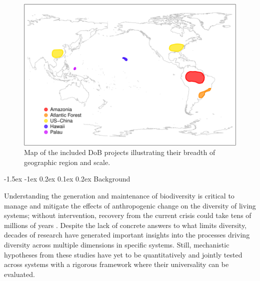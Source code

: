 \documentclass[11pt]{article}
\makeatletter
\renewcommand\subsection{\@startsection{subsection}{1}{\z@}%
                                  {-1.5ex \@plus -1ex \@minus 0.2ex}%
                                  {0.1ex \@plus 0.2ex}%
                                  {\normalfont\large\bfseries}}
\makeatother
\begin{document}
\begin{figure}
  \vspace{-10pt}
  \begin{center}
    \includegraphics[width=1\textwidth]{../fig_map.pdf}
  \end{center}
  \vspace{-10pt}
  {\caption{Map of the included DoB projects illustrating their breadth of
geographic region and scale.}\label{fig:map}}
\vspace{-10pt}
\end{figure}


\subsection{Background}\label{background}

Understanding the generation and maintenance of biodiversity is critical
to manage and mitigate the effects of anthropogenic change on the
diversity of living systems; without intervention, recovery from the
current crisis \cite{Barnosky2011-ww} could take tens of millions of
years \cite{Erwin2015-yb}. Despite the lack of concrete answers to what
limits diversity, decades of research have generated important insights
into the processes driving diversity across multiple dimensions in
specific systems. Still, mechanistic hypotheses from these studies have
yet to be quantitatively and jointly tested across systems with a
rigorous framework where their universality can be evaluated.
\end{document}
